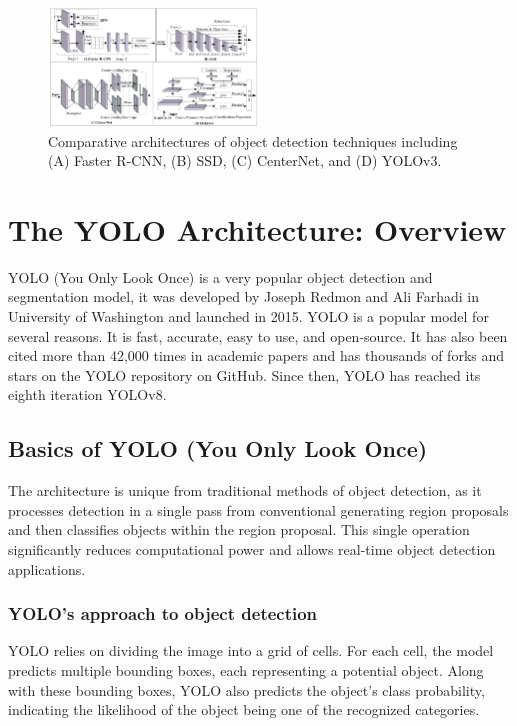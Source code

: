 \documentclass[11pt,journal,compsoc]{IEEEtran}
\begin{document}
\begin{figure}[ht]
  \centering
  \includegraphics[width=0.5\textwidth]{images/progression_comparison.png} 
  \caption{Comparative architectures of object detection techniques including (A) Faster R-CNN, (B) SSD, (C) CenterNet, and (D) YOLOv3.}
  \label{fig:progression comparison}
\end{figure}



\section{The YOLO Architecture: Overview}
YOLO (You Only Look Once) is a very popular object detection and segmentation model, it was developed by Joseph Redmon and Ali Farhadi in University of Washington and launched in 2015. YOLO is a popular model for several reasons. It is fast, accurate, easy to use, and open-source. It has also been cited more than 42,000 times in academic papers\cite{Redmon_2016_CVPR} and has thousands of forks and stars on the YOLO repository on GitHub\cite{ultralytics}. Since then, YOLO has reached its eighth iteration YOLOv8.\cite{yolov8_ultralytics}

\subsection{Basics of YOLO (You Only Look Once)}
The architecture is unique from traditional methods of object detection, as it processes detection in a single pass from conventional generating region proposals and then classifies objects within the region proposal. This single operation significantly reduces computational power and allows real-time object detection applications.\cite{yolov8_ultralytics}

\subsubsection{YOLO's approach to object detection}
YOLO relies on dividing the image into a grid of cells. For each cell, the model predicts multiple bounding boxes, each representing a potential object. Along with these bounding boxes, YOLO also predicts the object's class probability, indicating the likelihood of the object being one of the recognized categories\cite{Redmon_2016_CVPR}.
\end{document}
